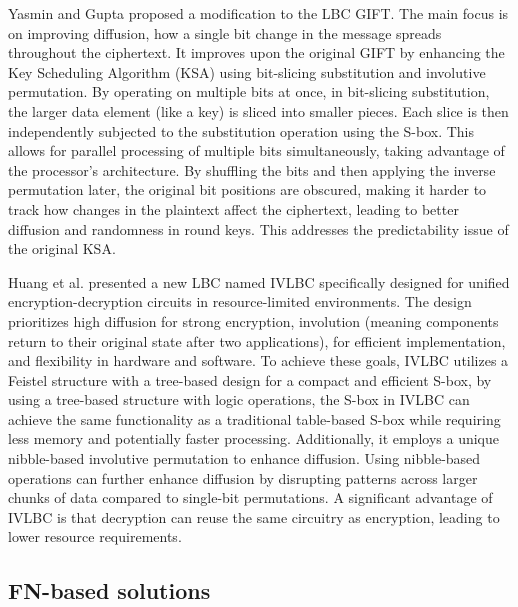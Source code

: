 \documentclass[conference]{IEEEtran}
\begin{document}
Yasmin and Gupta proposed a modification to the LBC GIFT. The main focus is on improving diffusion, how a single bit change in the message spreads throughout the ciphertext. It improves upon the original GIFT by enhancing the Key Scheduling Algorithm (KSA) using bit-slicing substitution and involutive permutation. By operating on multiple bits at once, in bit-slicing substitution, the larger data element (like a key) is sliced into smaller pieces. Each slice is then independently subjected to the substitution operation using the S-box. This allows for parallel processing of multiple bits simultaneously, taking advantage of the processor's architecture. By shuffling the bits and then applying the inverse permutation later, the original bit positions are obscured, making it harder to track how changes in the plaintext affect the ciphertext, leading to better diffusion and randomness in round keys. This addresses the predictability issue of the original KSA.\cite{GIFT}\cite{yasmin2023modified}


Huang et al. presented a new LBC named IVLBC specifically designed for unified encryption-decryption circuits in resource-limited environments. The design prioritizes high diffusion for strong encryption, involution (meaning components return to their original state after two applications), for efficient implementation, and flexibility in hardware and software. To achieve these goals, IVLBC utilizes a Feistel structure with a tree-based design for a compact and efficient S-box, by using a tree-based structure with logic operations, the S-box in IVLBC can achieve the same functionality as a traditional table-based S-box while requiring less memory and potentially faster processing. Additionally, it employs a unique nibble-based involutive permutation to enhance diffusion. Using nibble-based operations can further enhance diffusion by disrupting patterns across larger chunks of data compared to single-bit permutations. A significant advantage of IVLBC is that decryption can reuse the same circuitry as encryption, leading to lower resource requirements.\cite{IVLBC}

\subsection{FN-based solutions}
\end{document}

